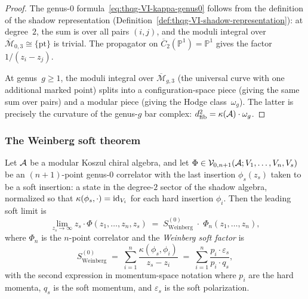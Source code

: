 \begin{proof}
The genus-$0$ formula~\eqref{eq:thqg-VI-kappa-genus0} follows
from the definition of the shadow representation
(Definition~\ref{def:thqg-VI-shadow-representation}): at degree~$2$,
the sum is over all pairs $(i,j)$, and the moduli integral over
$\overline{\mathcal{M}}_{0,3} \cong \{\mathrm{pt}\}$ is trivial.
The propagator on $\overline{C}_2(\mathbb{P}^1) = \mathbb{P}^1$
gives the factor $1/(z_i - z_j)$.

At genus~$g \geq 1$, the moduli integral over
$\overline{\mathcal{M}}_{g,3}$ (the universal curve with one
additional marked point) splits into a configuration-space piece
(giving the same sum over pairs) and a modular piece
(giving the Hodge class~$\omega_g$). The latter is precisely
the curvature of the genus-$g$ bar complex:
$d_{\mathrm{fib}}^2 = \kappa(\mathcal{A}) \cdot \omega_g$.
\end{proof}

\subsubsection{The Weinberg soft theorem}

\begin{theorem}
\label{thm:thqg-VI-leading-soft}
Let $\mathcal{A}$ be a modular Koszul chiral algebra, and let
$\Phi \in \mathcal{V}_{0,n+1}(\mathcal{A}; V_1, \dotsc, V_n, V_s)$ be an
$(n+1)$-point genus-$0$ correlator with the last insertion
$\phi_s(z_s)$ taken to be a soft insertion: a state in the
degree-$2$ sector of the shadow algebra, normalized so that
$\kappa(\phi_s, \cdot) = \mathrm{id}_{V_i}$ for each hard insertion
$\phi_i$. Then the leading soft limit is
\begin{equation}\label{eq:thqg-VI-weinberg}
\lim_{z_s \to \infty}
z_s \cdot \Phi(z_1, \dotsc, z_n, z_s)
\;=\;
S^{(0)}_{\mathrm{Weinberg}}
\;\cdot\;
\Phi_n(z_1, \dotsc, z_n),
\end{equation}
where $\Phi_n$ is the $n$-point correlator and the
\emph{Weinberg soft factor} is
\begin{equation}\label{eq:thqg-VI-weinberg-factor}
S^{(0)}_{\mathrm{Weinberg}}
\;=\;
\sum_{i=1}^{n}
\frac{\kappa(\phi_s, \phi_i)}{z_s - z_i}
\;=\;
\sum_{i=1}^{n}
\frac{p_i \cdot \varepsilon_s}{p_i \cdot q_s},
\end{equation}
with the second expression in momentum-space notation where
$p_i$ are the hard momenta, $q_s$ is the soft momentum, and
$\varepsilon_s$ is the soft polarization.
\end{theorem}

